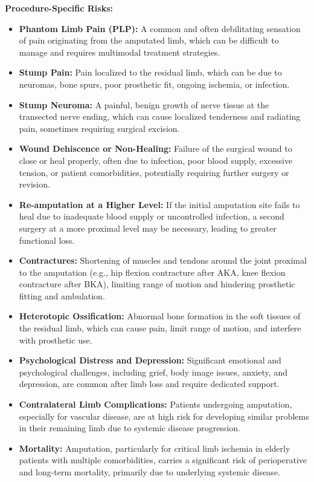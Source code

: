 \textbf{Procedure-Specific Risks:}
\begin{itemize}
  \item \textbf{Phantom Limb Pain (PLP):} A common and often debilitating sensation of pain originating from the amputated limb, which can be difficult to manage and requires multimodal treatment strategies.
  \item \textbf{Stump Pain:} Pain localized to the residual limb, which can be due to neuromas, bone spurs, poor prosthetic fit, ongoing ischemia, or infection.
  \item \textbf{Stump Neuroma:} A painful, benign growth of nerve tissue at the transected nerve ending, which can cause localized tenderness and radiating pain, sometimes requiring surgical excision.
  \item \textbf{Wound Dehiscence or Non-Healing:} Failure of the surgical wound to close or heal properly, often due to infection, poor blood supply, excessive tension, or patient comorbidities, potentially requiring further surgery or revision.
  \item \textbf{Re-amputation at a Higher Level:} If the initial amputation site fails to heal due to inadequate blood supply or uncontrolled infection, a second surgery at a more proximal level may be necessary, leading to greater functional loss.
  \item \textbf{Contractures:} Shortening of muscles and tendons around the joint proximal to the amputation (e.g., hip flexion contracture after AKA, knee flexion contracture after BKA), limiting range of motion and hindering prosthetic fitting and ambulation.
  \item \textbf{Heterotopic Ossification:} Abnormal bone formation in the soft tissues of the residual limb, which can cause pain, limit range of motion, and interfere with prosthetic use.
  \item \textbf{Psychological Distress and Depression:} Significant emotional and psychological challenges, including grief, body image issues, anxiety, and depression, are common after limb loss and require dedicated support.
  \item \textbf{Contralateral Limb Complications:} Patients undergoing amputation, especially for vascular disease, are at high risk for developing similar problems in their remaining limb due to systemic disease progression.
  \item \textbf{Mortality:} Amputation, particularly for critical limb ischemia in elderly patients with multiple comorbidities, carries a significant risk of perioperative and long-term mortality, primarily due to underlying systemic disease.
\end{itemize}

